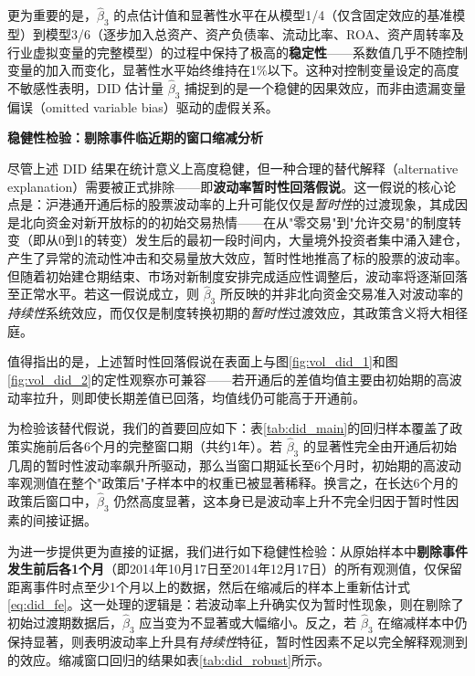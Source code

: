 \documentclass{article}
\begin{document}
更为重要的是，$\hat{\beta}_3$ 的点估计值和显著性水平在从模型1/4（仅含固定效应的基准模型）到模型3/6（逐步加入总资产、资产负债率、流动比率、ROA、资产周转率及行业虚拟变量的完整模型）的过程中保持了极高的\textbf{稳定性}——系数值几乎不随控制变量的加入而变化，显著性水平始终维持在1\%以下。这种对控制变量设定的高度不敏感性表明，DID 估计量 $\hat{\beta}_3$ 捕捉到的是一个稳健的因果效应，而非由遗漏变量偏误（omitted variable bias）驱动的虚假关系。

\vspace{0.5em}
\noindent\textbf{稳健性检验：剔除事件临近期的窗口缩减分析}

尽管上述 DID 结果在统计意义上高度稳健，但一种合理的替代解释（alternative explanation）需要被正式排除——即\textbf{波动率暂时性回落假说}。这一假说的核心论点是：沪港通开通后标的股票波动率的上升可能仅仅是\textit{暂时性}的过渡现象，其成因是北向资金对新开放标的的初始交易热情——在从"零交易"到"允许交易"的制度转变（即从0到1的转变）发生后的最初一段时间内，大量境外投资者集中涌入建仓，产生了异常的流动性冲击和交易量放大效应，暂时性地推高了标的股票的波动率。但随着初始建仓期结束、市场对新制度安排完成适应性调整后，波动率将逐渐回落至正常水平。若这一假说成立，则 $\hat{\beta}_3$ 所反映的并非北向资金交易准入对波动率的\textit{持续性}系统效应，而仅仅是制度转换初期的\textit{暂时性}过渡效应，其政策含义将大相径庭。

值得指出的是，上述暂时性回落假说在表面上与图\ref{fig:vol_did_1}和图\ref{fig:vol_did_2}的定性观察亦可兼容——若开通后的差值均值主要由初始期的高波动率拉升，则即使长期差值已回落，均值线仍可能高于开通前。

为检验该替代假说，我们的首要回应如下：表\ref{tab:did_main}的回归样本覆盖了政策实施前后各6个月的完整窗口期（共约1年）。若 $\hat{\beta}_3$ 的显著性完全由开通后初始几周的暂时性波动率飙升所驱动，那么当窗口期延长至6个月时，初始期的高波动率观测值在整个"政策后"子样本中的权重已被显著稀释。换言之，在长达6个月的政策后窗口中，$\hat{\beta}_3$ 仍然高度显著，这本身已是波动率上升不完全归因于暂时性因素的间接证据。

为进一步提供更为直接的证据，我们进行如下稳健性检验：从原始样本中\textbf{剔除事件发生前后各1个月}（即2014年10月17日至2014年12月17日）的所有观测值，仅保留距离事件时点至少1个月以上的数据，然后在缩减后的样本上重新估计式\ref{eq:did_fe}。这一处理的逻辑是：若波动率上升确实仅为暂时性现象，则在剔除了初始过渡期数据后，$\hat{\beta}_3$ 应当变为不显著或大幅缩小。反之，若 $\hat{\beta}_3$ 在缩减样本中仍保持显著，则表明波动率上升具有\textit{持续性}特征，暂时性因素不足以完全解释观测到的效应。缩减窗口回归的结果如表\ref{tab:did_robust}所示。
\end{document}
